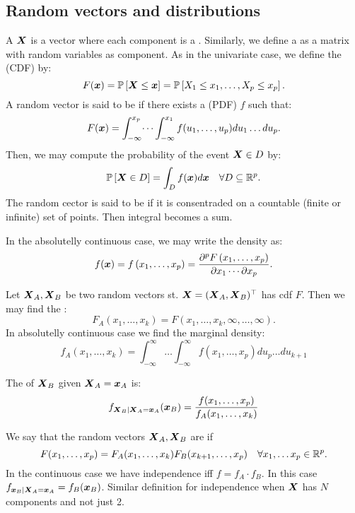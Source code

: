 \subsection{Random vectors and distributions}

A  $\boldsymbol{X}$ is a vector where each component is a . Similarly, we define a  as a matrix with random variables as component. As in the univariate case, we define the  (CDF) by:
$$
    F(\boldsymbol{x})=\mathbb{P}\left[\boldsymbol{X}\leq \boldsymbol{x}\right] = \mathbb{P}\left[X_1\leq x_1,\dots,X_p\leq x_p\right].
$$
A random vector is said to be  if there exists a  (PDF) $f$ such that:
$$
    F(\boldsymbol{x})=\int_{-\infty}^{x_p}\dots\int_{-\infty}^{x_1} f(u_1,\dots,u_p) du_1\dots du_p.
$$
Then, we may compute the probability of the event $\boldsymbol{X}\in D$ by:
$$
    \mathbb{P}\left[\boldsymbol{X}\in D\right] = \int_D f(\boldsymbol{x}) d\boldsymbol{x} \quad\forall D\subseteq \mathbb{R}^p.
$$
The random cector is said to be  if it is consentraded on a countable (finite or infinite) set of points. Then integral becomes a sum. 

In the absolutelly continuous case, we may write the density as:
$$
    f(\boldsymbol{x})=f\left(x_1, \ldots, x_p\right)=\frac{\partial^p F\left(x_1, \ldots, x_p\right)}{\partial x_1 \cdots \partial x_p}.
$$

Let $\boldsymbol{X}_A, \boldsymbol{X}_B$ be two random vectors st. $\boldsymbol{X}=(\boldsymbol{X}_A,\boldsymbol{X}_B)^\top$ has cdf $F$. Then we may find the :
$$
    F_A(x_1,\dots,x_k) = F(x_1,\dots,x_k,\infty,\dots,\infty).
$$
In absolutelly continuous case we find the marginal density:
$$
    f_A(x_1,\dots,x_k) = \int_{-\infty}^{\infty}\dots\int_{-\infty}^{\infty} f(x_1,\dots,x_p) du_p\dots du_{k+1}
$$

The  of $\boldsymbol{X}_B$ given $\boldsymbol{X}_A = \boldsymbol{x}_A$ is:
$$
    f_{\boldsymbol{X}_B|\boldsymbol{X}_A=\boldsymbol{x}_A}(\boldsymbol{x}_B) = \frac{f(x_1,\dots,x_p)}{f_A(x_1,\dots,x_k)}
$$

We say that the random vectors $\boldsymbol{X}_A, \boldsymbol{X}_B$ are  if 
$$
    F(x_1,\dots,x_p)=F_A(x_1,\dots,x_k)F_B(x_{k+1},\dots,x_p) \quad\forall x_1,\dots x_p \in \mathbb{R}^p.
$$
In the continuous case we have independence iff $f=f_A\cdot f_B$. In this case $f_{\boldsymbol{x}_B|\boldsymbol{X}_A=\boldsymbol{x}_A} = f_B(\boldsymbol{x}_B)$.
Similar definition for independence when $\boldsymbol{X}$ has $N$ components and not just 2.

